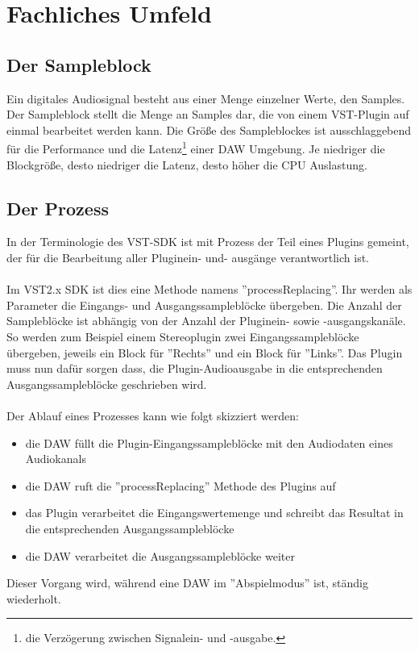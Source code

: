 \section{Fachliches Umfeld}
\subsection{\label{sampleblock}Der Sampleblock}
Ein digitales Audiosignal besteht aus einer Menge einzelner Werte, den Samples. Der Sampleblock stellt die Menge an Samples dar, die von einem VST-Plugin auf einmal bearbeitet werden kann. Die Größe des Sampleblockes ist ausschlaggebend für die Performance und die Latenz\footnote{die Verzögerung zwischen Signalein- und -ausgabe.} einer DAW Umgebung. Je niedriger die Blockgröße, desto niedriger die Latenz, desto höher die CPU Auslastung.
\subsection{\label{Prozess}Der Prozess}
In der Terminologie des VST-SDK ist mit Prozess der Teil eines Plugins gemeint, der für die Bearbeitung aller Pluginein- und- ausgänge verantwortlich ist.
\\\\
Im VST2.x SDK ist dies eine Methode namens ''processReplacing''. Ihr werden als Parameter die Eingangs- und Ausgangssampleblöcke übergeben. Die Anzahl der Sampleblöcke ist abhängig von der Anzahl der Pluginein- sowie -ausgangskanäle. So werden zum Beispiel einem Stereoplugin zwei Eingangssampleblöcke übergeben, jeweils ein Block für ''Rechts'' und ein Block für ''Links''. Das Plugin muss nun dafür sorgen dass, die Plugin-Audioausgabe in die entsprechenden Ausgangssampleblöcke geschrieben wird.
\\\\
Der Ablauf eines Prozesses kann wie folgt skizziert werden:
\begin{itemize}
	\item die DAW füllt die Plugin-Eingangssampleblöcke mit den Audiodaten eines Audiokanals
	\item die DAW ruft die ''processReplacing'' Methode des Plugins auf
	\item das Plugin verarbeitet die Eingangswertemenge und schreibt das Resultat in die entsprechenden Ausgangssampleblöcke
	\item die DAW verarbeitet die Ausgangssampleblöcke weiter
\end{itemize}
Dieser Vorgang wird, während eine DAW im ''Abspielmodus'' ist, ständig wiederholt.